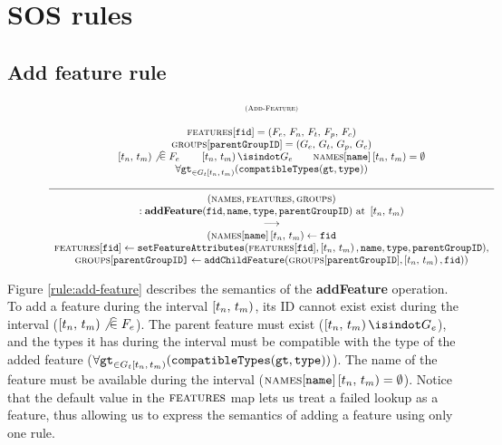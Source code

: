\section{SOS rules}
\label{sec:sos-rules}


\subsection{Add feature rule}

\begin{figure}[h]
    \renewcommand{\arraystretch}{1.1}
    \sossize$$\begin{array}{c}
      \ntyperule{Add-Feature}
      {\\
        \features{}[\var{fid}] = (F_e,\, F_n,\, F_t,\, F_p,\, F_c) \\
        \groups{}[\var{parentGroupID}] = (G_e,\, G_t , \, G_p,\, G_c)\\
        \interval{t_n}{t_m} \not \innr F_e \qquad
        \interval{t_n}{t_m} \inn G_e \qquad
        \names{}[\var{name}]\interval{t_n}{t_m} = \emptyset \\
        \forall \var{gt}_{\in G_t\interval{t_n}{t_m}} (\var{compatibleTypes}(\var{gt}, \var{type})) \\
      }
      {
        (\names{}, \features{}, \groups{})\\
        :\textbf{addFeature}(\var{fid}, \var{name}, \var{type}, \var{parentGroupID})\text{ at }\interval{t_n}{t_m} \\
      \transition\\
        (\assign{\names{}[\var{name}]\interval{t_n}{t_m}}{\var{fid}}\\
        \assign{\features{}[\var{fid}]}
        {\var{setFeatureAttributes}(\features{}[\var{fid}], \interval{t_n}{t_m}, 
        \var{name}, \var{type}, \var{parentGroupID})},\\
        \assign{\groups{}[\var{parentGroupID]}}
        {\var{addChildFeature}(\groups{}[\var{parentGroupID}], \interval{t_n}{t_m}, \var{fid})})
    }
    \end{array}$$
    \caption{\label{rule:add-feature}}
\end{figure}

Figure \vref{rule:add-feature}  describes the semantics of the \textbf{addFeature} operation. 
To add a feature during the interval $\left[ t_n,\, t_m \right)$, its ID cannot exist exist during the interval ($\left[ t_n,\, t_m \right) \not \, \widehat{\in} \; F_e$). The parent feature must exist ($\interval{t_n}{t_m} \inn G_e$), and the types it has during the interval must be compatible with the type of the 
added feature ($\forall \texttt{gt}_{\in G_t\left[ t_n,\, t_m \right)} (\texttt{compatibleTypes}(\texttt{gt}, \texttt{type}))$). The name of the feature must be available during the interval ($\textsc{names}{}[\texttt{name}]\left[ t_n,\, t_m \right) = \emptyset$). Notice that the default value in the $\textsc{features}{}$ map lets us treat a failed lookup as a feature, thus allowing us to express the semantics of adding a feature using only one rule. 

